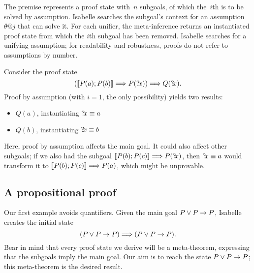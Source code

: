 The premise represents a proof state with~$n$ subgoals, of which the~$i$th
is to be solved by assumption.  Isabelle searches the subgoal's context for
an assumption~$\theta@j$ that can solve it.  For each unifier, the
meta-inference returns an instantiated proof state from which the $i$th
subgoal has been removed.  Isabelle searches for a unifying assumption; for
readability and robustness, proofs do not refer to assumptions by number.

Consider the proof state 
\[ (\mathopen{[\![} P(a); P(b)\mathclose{]\!]} \Longrightarrow P({?\!x})) \Longrightarrow Q({?\!x}). \]
Proof by assumption (with $i=1$, the only possibility) yields two results:
\begin{itemize}
  \item $Q(a)$, instantiating ${?\!x}\equiv a$
  \item $Q(b)$, instantiating ${?\!x}\equiv b$
\end{itemize}
Here, proof by assumption affects the main goal.  It could also affect
other subgoals; if we also had the subgoal ${\mathopen{[\![} P(b); P(c)\mathclose{]\!]} \Longrightarrow
  P({?\!x})}$, then ${?\!x}\equiv a$ would transform it to ${\mathopen{[\![} P(b);
    P(c)\mathclose{]\!]} \Longrightarrow P(a)}$, which might be unprovable.


\subsection{A propositional proof} \label{prop-proof}
Our first example avoids quantifiers.  Given the main goal $P\vee P\rightarrow
P$, Isabelle creates the initial state
\[ (P\vee P\rightarrow P)\Longrightarrow (P\vee P\rightarrow P). \] 
%
Bear in mind that every proof state we derive will be a meta-theorem,
expressing that the subgoals imply the main goal.  Our aim is to reach the
state $P\vee P\rightarrow P$; this meta-theorem is the desired result.

